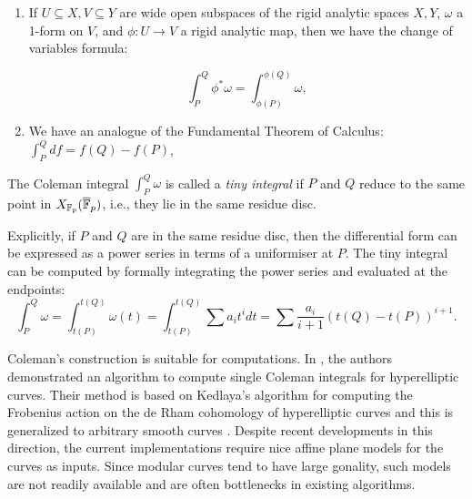 \begin{theorem}
\begin{enumerate}
        \item If $U \subseteq X, V \subseteq Y $ are wide open subspaces of the rigid analytic spaces $X,Y$, $\omega$ a 1-form on $V$, and $\phi:U \rightarrow V$ a rigid analytic map, then we have the change of variables formula:
        
        \begin{equation*}
            \int_P^Q \phi^* \omega = \int_{\phi(P)}^{\phi(Q)} \omega,
        \end{equation*}
        \item We have an analogue of the Fundamental Theorem of Calculus: $\int_P^Q df = f(Q) - f(P)$,

\end{enumerate}
\end{theorem}

\begin{defn}\label{def:tiny_integral}
The Coleman integral $\int_P^Q \omega$ is called a \emph{tiny integral} if $P$ and $Q$ reduce to the same point in $X_{\mathbb{F}_p}(\overline{\mathbb{F}}_p)$, i.e., they lie in the same residue disc.

\end{defn}


Explicitly, if $P$ and $Q$ are in the same residue disc, then the differential form can be expressed as a power series in terms of a uniformiser at $P$. The tiny integral can be computed by formally integrating the power series and evaluated at the endpoints: \[\int_P^Q \omega = \int_{t(P)}^{t(Q)} \omega(t) = \int_{t(P)}^{t(Q)}\sum a_i t^i dt= \sum \frac{a_i}{i+1} (t(Q) - t(P))^{i+1}.\]


Coleman’s construction is suitable for computations. In \cite{BBK10}, the authors demonstrated an algorithm to compute single Coleman integrals for hyperelliptic curves. Their method is based on Kedlaya's algorithm for computing the Frobenius action on the de Rham cohomology of hyperelliptic curves \cite{Kedlaya_coho_hyper} and this is generalized to arbitrary smooth curves \cite{balatuit, Tui16, Tui17}. Despite recent developments in this direction, the current implementations require nice affine plane models for the curves as inputs. Since modular curves tend to have large gonality, such models are not readily available and are often bottlenecks in existing algorithms.